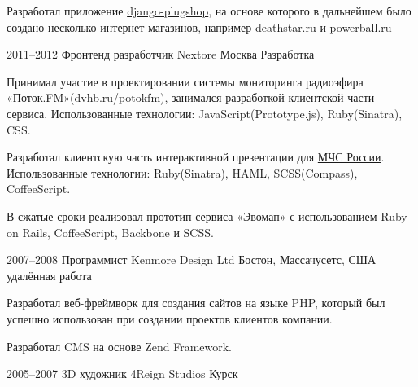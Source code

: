 \documentclass[11pt,a4paper,sans]{moderncv}
\newcommand{\lang}[2]{#1}
\begin{document}
\cvlistitem
    {\lang
        {Разработал приложение \href{https://github.com/ChillyBwoy/django-plugshop}{django-plugshop}, на основе которого в дальнейшем было создано несколько интернет-магазинов, например deathstar.ru и \href{http://powerball.ru}{powerball.ru}}
        {Design applications ... TODO}\newline}


\cventry
    {2011--2012}
    {\lang
        {Фронтенд разработчик}
        {Front End Developer}}
    {Nextore}
    {\lang
        {Москва}
        {Moscow}}
    {}
    {\lang
        {Разработка}
        {Development}}

\cvlistitem
    {\lang
        {Принимал участие в проектировании системы мониторинга радиоэфира «Поток.FM»(\href{https://dvhb.ru/potokfm}{dvhb.ru/potokfm}), занимался разработкой клиентской части сервиса. Использованные технологии: JavaScript(Prototype.js), Ruby(Sinatra), CSS.}
        {Participated in design of system for monitoring of radio broadcasting, designed front-end part of the project. «Potok.FM»(\href{https://dvhb.ru/en/potokfm}{dvhb.ru/potokfm})}}

\cvlistitem
    {\lang
        {Разработал клиентскую часть интерактивной презентации для \href{http://nextore.ru/projects/3}{МЧС России}. Использованные технологии: Ruby(Sinatra), HAML, SCSS(Compass), CoffeeScript.}
        {TODO}}

\cvlistitem
    {\lang
        {В сжатые сроки реализовал прототип сервиса «\href{http://dvhb.ru/evomap}{Эвомап}» с использованием Ruby on Rails, CoffeeScript, Backbone и SCSS.}
        {TODO}\newline}


\cventry
    {2007--2008}
    {\lang
        {Программист}
        {Developer}}
    {Kenmore Design Ltd}
    {\lang
        {Бостон, Массачусетс, США}
        {Boston, MA, US}}
    {\lang
        {удалённая работа}
        {remote work}}
    {}

\cvlistitem
    {\lang
        {Разработал веб-фреймворк для создания сайтов на языке PHP, который был успешно использован при создании проектов клиентов компании.}
        {TODO}}

\cvlistitem
    {\lang
        {Разработал CMS на основе Zend Framework.}
        {TODO}\newline}


\cventry
    {2005--2007}
    {\lang
        {3D художник}
        {3D Artist}}
    {4Reign Studios}
    {\lang
        {Курск}
        {Kursk}}
    {}
    {}
\end{document}
